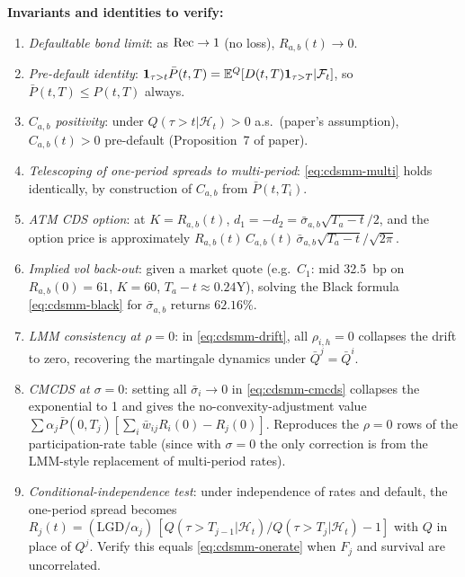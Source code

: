 \documentclass[11pt,a4paper]{article}
\begin{document}
\begin{validation}
\textbf{Invariants and identities to verify:}
\begin{enumerate}[noitemsep]
  \item \emph{Defaultable bond limit}: as $\mathrm{Rec} \to 1$ (no loss),
        $R_{a,b}(t) \to 0$.
  \item \emph{Pre-default identity}: $\mathbf{1}_{\tau > t} \bar P(t, T)
        = \mathbb{E}^Q[D(t,T)\mathbf{1}_{\tau>T}|\mathcal{F}_t]$, so
        $\bar P(t, T) \le P(t, T)$ always.
  \item \emph{$C_{a,b}$ positivity}: under
        $Q(\tau > t|\mathcal{H}_t) > 0$ a.s.\ (paper's assumption),
        $C_{a,b}(t) > 0$ pre-default (Proposition~7 of paper).
  \item \emph{Telescoping of one-period spreads to multi-period}:
        \eqref{eq:cdsmm-multi} holds identically, by construction of
        $C_{a,b}$ from $\bar P(t, T_i)$.
  \item \emph{ATM CDS option}: at $K = R_{a,b}(t)$,
        $d_1 = -d_2 = \bar\sigma_{a,b}\sqrt{T_a-t}/2$, and the option
        price is approximately
        $R_{a,b}(t)\, C_{a,b}(t)\, \bar\sigma_{a,b}\sqrt{T_a-t}/\sqrt{2\pi}$.
  \item \emph{Implied vol back-out}: given a market quote
        (e.g.\ $C_1$: mid 32.5~bp on $R_{a,b}(0)=61$, $K=60$,
        $T_a - t \approx 0.24$Y), solving the Black formula
        \eqref{eq:cdsmm-black} for $\bar\sigma_{a,b}$ returns
        $62.16\%$.
  \item \emph{LMM consistency at $\rho = 0$}: in \eqref{eq:cdsmm-drift},
        all $\rho_{i,h} = 0$ collapses the drift to zero, recovering
        the martingale dynamics under $\bar Q^j = \bar Q^i$.
  \item \emph{CMCDS at $\sigma = 0$}: setting all
        $\bar\sigma_i \to 0$ in \eqref{eq:cdsmm-cmcds} collapses the
        exponential to 1 and gives the no-convexity-adjustment value
        $\sum \alpha_j \bar P(0, T_j) [\sum_i \bar w_{ij} R_i(0) - R_j(0)]$.
        Reproduces the $\rho = 0$ rows of the participation-rate
        table (since with $\sigma = 0$ the only correction is from
        the LMM-style replacement of multi-period rates).
  \item \emph{Conditional-independence test}: under independence of
        rates and default, the one-period spread becomes
        $R_j(t) = (\mathrm{LGD}/\alpha_j)\, [Q(\tau > T_{j-1}|\mathcal{H}_t)/Q(\tau > T_j|\mathcal{H}_t) - 1]$
        with $Q$ in place of $Q^j$. Verify this equals
        \eqref{eq:cdsmm-onerate} when $F_j$ and survival are uncorrelated.
\end{enumerate}
\end{validation}
\end{document}
